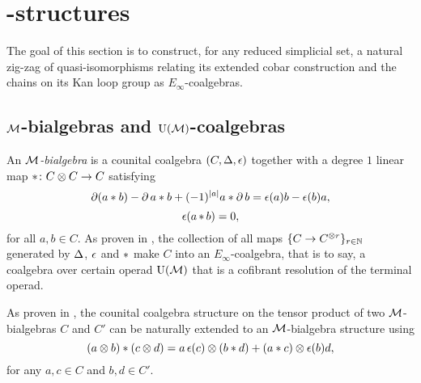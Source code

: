 

\section{\pdfEinfty-structures}\label{s:e-infty}

The goal of this section is to construct, for any reduced simplicial set, a natural zig-zag of quasi-isomorphisms relating its extended cobar construction and the chains on its Kan loop group as $E_\infty$-coalgebras.

\subsection{$\mathcal{M}$-bialgebras and ${\operatorname{U}(\mathcal{M})}$-coalgebras}\label{ss:e-infty extension}

An \textit{$\mathcal{M}$-bialgebra} is a counital coalgebra $(C, \operatorname{\Delta}, \operatorname{\epsilon})$ together with a degree $1$ linear map $\operatorname{\ast} \colon C \otimes C \to C$ satisfying
\[
\operatorname{\partial} (a \ast b) - \operatorname{\partial} a \ast b + (-1)^{\lvert a\rvert} a \ast \operatorname{\partial} b =
\operatorname{\epsilon}(a) b - \operatorname{\epsilon}(b) a,
\]
\[
\operatorname{\epsilon} (a \operatorname{\ast} b) = 0,
\]
for all $a, b \in C$.
As proven in \cite{medina2020prop1}, the collection of all maps $\{C \to C^{\otimes r}\}_{r \in \mathbb{N}}$ generated by $\operatorname{\Delta}$, $\operatorname{\epsilon}$ and $\operatorname{\ast}$ make $C$ into an $E_\infty$-coalgebra, that is to say, a coalgebra over certain operad ${\operatorname{U}(\mathcal{M})}$ that is a cofibrant resolution of the terminal operad.

As proven in \cite{medina2021cobar}, the counital coalgebra structure on the tensor product of two $\mathcal{M}$-bialgebras $C$ and $C'$ can be naturally extended to an $\mathcal{M}$-bialgebra structure using
\begin{equation}\label{eq:monoidal_product}
	(a \otimes b) \ast (c \otimes d) =
	a \operatorname{\epsilon}(c) \otimes (b \ast d) + (a \ast c) \otimes \operatorname{\epsilon}(b) d,
\end{equation}
for any $a,c \in C$ and $b,d \in C'$.

